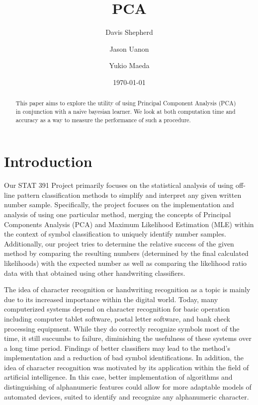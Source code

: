 \documentclass[twocolumn]{article}
\title{PCA}
\author{ Davis Shepherd \and Jason Uanon \and Yukio Maeda}
\date{\today}
\begin{document}
\ifpdf
{}
\else
{}
\fi

\maketitle


\begin{abstract}
    This paper aims to explore the utility of using Principal Component Analysis (PCA) in conjunction with a naive bayesian learner.  We look at both computation time and accuracy as a way to measure the performance of such a procedure.
\end{abstract}

\section{Introduction} %
\label{sec:introduction}
Our STAT 391 Project primarily focuses on the statistical analysis of using off-line pattern classification methods to simplify and interpret any given written number sample. Specifically, the project focuses on the implementation and analysis of using one particular method, merging the concepts of Principal Components Analysis (PCA) and Maximum Likelihood Estimation (MLE) within the context of symbol classification to uniquely identify number samples. Additionally, our project tries to determine the relative success of the given method by comparing the resulting numbers (determined by the final calculated likelihoods) with the expected number as well as comparing the likelihood ratio data with that obtained using other handwriting classifiers. 

The idea of character recognition or handwriting recognition as a topic is mainly due to its increased importance within the digital world. Today, many computerized systems depend on character recognition for basic operation including computer tablet software, postal letter software, and bank check processing equipment. While they do correctly recognize symbols most of the time, it still succumbs to failure, diminishing the usefulness of these systems over a long time period. Findings of better classifiers may lead to the method's implementation and a reduction of bad symbol identifications. In addition, the idea of character recognition was motivated by its application within the field of artificial intelligence. In this case, better implementation of algorithms and distinguishing of alphanumeric features could allow for more adaptable models of automated devices, suited to identify and recognize any alphanumeric character.
\end{document}
